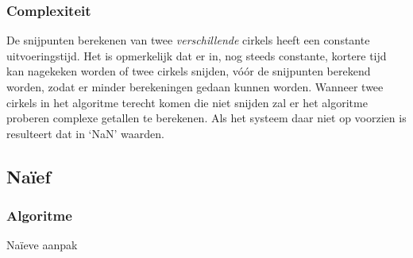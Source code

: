 \subsubsection{Complexiteit}
De snijpunten berekenen van twee \emph{verschillende} cirkels heeft
een constante uitvoeringstijd. Het is opmerkelijk dat er in, nog
steeds constante, kortere tijd kan nagekeken worden of twee cirkels
snijden, v\'o\'or de snijpunten berekend worden, zodat er minder
berekeningen gedaan kunnen worden.
Wanneer twee cirkels in het algoritme terecht komen die niet snijden
zal er het algoritme proberen complexe getallen te berekenen. Als het
systeem daar niet op voorzien is resulteert dat in `NaN' waarden.

\subsection{Na\"ief}
\label{sec:naief}

\subsubsection{Algoritme}

\begin{algorithm}[H]
  \SetAlgoLined
  \caption{Na\"ieve aanpak}
  \label{algo:naive}
\end{algorithm}

